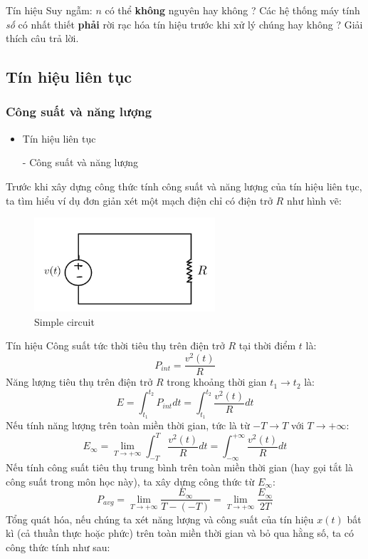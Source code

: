 \documentclass[8pt]{beamer}
\begin{document}
\begin{frame}{Tín hiệu}
Suy ngẫm: $n$ có thể \textbf{không} nguyên hay không ? Các hệ thống máy tính \textit{số} có nhất thiết \textbf{phải} rời rạc hóa tín hiệu trước khi xử lý chúng hay không ? Giải thích câu trả lời.
\subsection{Tín hiệu liên tục}
\subsubsection{Công suất và năng lượng}
\begin{itemize}
	\item Tín hiệu liên tục
\end{itemize}
	\begin{itemize}
		\item[-] Công suất và năng lượng
	\end{itemize}

Trước khi xây dựng công thức tính công suất và năng lượng của tín hiệu liên tục, ta tìm hiểu ví dụ đơn giản xét một mạch điện chỉ có điện trở $R$ như hình vẽ:
  \begin{figure}[h]
			\includegraphics[width=0.6\textwidth]{r.jpg}
			\caption{Simple circuit}			\label{fig:re3}
		\end{figure}
\end{frame}
\begin{frame}{Tín hiệu}
Công suất tức thời tiêu thụ trên điện trở $R$ tại thời điểm $t$ là:
$$P_{int}=\frac{v^{2}(t)}{R}$$
Năng lượng tiêu thụ trên điện trở $R$ trong khoảng thời gian $t_{1}\to t_{2}$ là:
$$E=\int_{t_{1}}^{t_{2}}P_{int}dt=\int_{t_{1}}^{t_{2}}\frac{v^{2}(t)}{R}dt$$
Nếu tính năng lượng trên toàn miền thời gian, tức là từ $-T \to T$ với $T\to+\infty$:
$$E_{\infty}=\lim_{T\to+\infty}\int_{-T}^{T}\frac{v^{2}(t)}{R}dt=\int_{-\infty}^{+\infty}\frac{v^{2}(t)}{R}dt$$
Nếu tính công suất tiêu thụ \alert{trung bình} trên toàn miền thời gian (hay gọi tắt là công suất trong môn học này), ta xây dựng công thức từ $E_{\infty}$:
$$P_{avg}=\lim_{T\to +\infty}\frac{E_{\infty}}{T-(-T)}=\lim_{T\to+\infty}\frac{E_{\infty}}{2T}$$
Tổng quát hóa, nếu chúng ta xét năng lượng và công suất của tín hiệu $x(t)$ bất kì (cả thuần thực hoặc phức) trên toàn miền thời gian và bỏ qua hằng số, ta có công thức tính như sau:
\end{frame}
\end{document}
